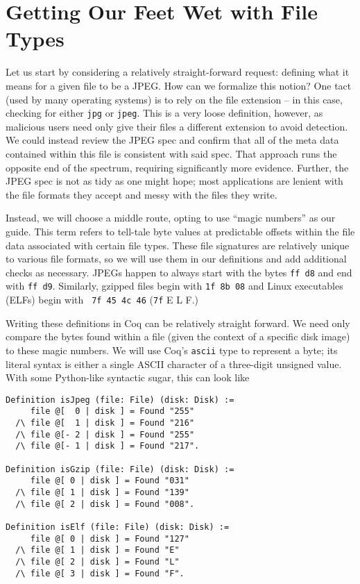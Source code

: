 \documentclass[nocopyrightspace]{sigplanconf}
\begin{document}
\section{Getting Our Feet Wet with File Types}

Let us start by considering a relatively straight-forward request: defining
what it means for a given file to be a JPEG. How can we formalize this notion?
One tact (used by many operating systems) is to rely on the file extension --
in this case, checking for either {\tt jpg} or {\tt jpeg}. This is a very
loose definition, however, as malicious users need only give their files a
different extension to avoid detection. We could instead review the JPEG spec
and confirm that all of the meta data contained within this file is consistent
with said spec. That approach runs the opposite end of the spectrum, requiring
significantly more evidence. Further, the JPEG spec is not as tidy as one
might hope; most applications are lenient with the file formats they accept
and messy with the files they write.

Instead, we will choose a middle route, opting to use ``magic numbers'' as our
guide. This term refers to tell-tale byte values at predictable offsets within
the file data associated with certain file types. These file signatures are
relatively unique to various file formats, so we will use them in our
definitions and add additional checks as necessary. JPEGs happen to always
start with the bytes {\tt ff d8} and end with {\tt ff d9}. Similarly, gzipped
files begin with {\tt 1f 8b 08} and Linux executables (ELFs) begin with {\tt
7f 45 4c 46} ({\tt 7f} E L F.)

Writing these definitions in Coq can be relatively straight forward. We need
only compare the bytes found within a file (given the context of a specific
disk image) to these magic numbers. We will use Coq's {\tt ascii} type to
represent a byte; its literal syntax is either a single ASCII character of a
three-digit unsigned value. With some Python-like syntactic sugar, this can
look like

\begin{lstlisting}
Definition isJpeg (file: File) (disk: Disk) :=
     file @[  0 | disk ] = Found "255"
  /\ file @[  1 | disk ] = Found "216"
  /\ file @[- 2 | disk ] = Found "255"
  /\ file @[- 1 | disk ] = Found "217".

Definition isGzip (file: File) (disk: Disk) :=
     file @[ 0 | disk ] = Found "031"
  /\ file @[ 1 | disk ] = Found "139" 
  /\ file @[ 2 | disk ] = Found "008".

Definition isElf (file: File) (disk: Disk) :=
     file @[ 0 | disk ] = Found "127"
  /\ file @[ 1 | disk ] = Found "E"
  /\ file @[ 2 | disk ] = Found "L"
  /\ file @[ 3 | disk ] = Found "F".
\end{lstlisting}
\end{document}
